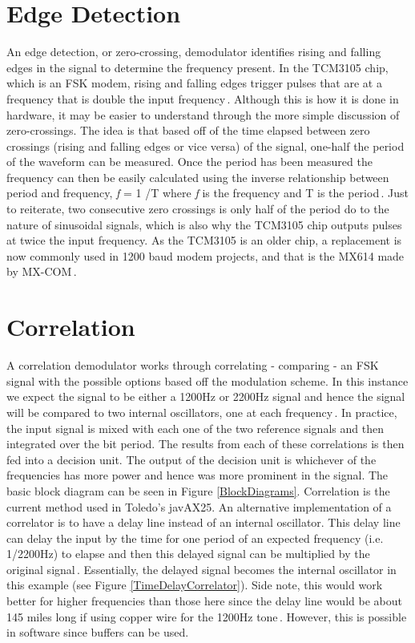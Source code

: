 \section{Edge Detection}
An edge detection, or zero-crossing, demodulator identifies rising and falling edges in the signal to determine the frequency present. In the TCM3105 chip, which is an FSK modem, rising and falling edges trigger pulses that are at a frequency that is double the input frequency\,\cite{Instruments1994}. Although this is how it is done in hardware, it may be easier to understand through the more simple discussion of zero-crossings. The idea is that based off of the time elapsed between zero crossings (rising and falling edges or vice versa) of the signal, one-half the period of the waveform can be measured. Once the period has been measured the frequency can then be easily calculated using the inverse relationship between period and frequency, \textit{f} = 1 /T where \textit{f} is the frequency and T is the period\,\cite{Seguine2006}. Just to reiterate, two consecutive zero crossings is only half of the period do to the nature of sinusoidal signals, which is also why the TCM3105 chip outputs pulses at twice the input frequency. As the TCM3105 is an older chip, a replacement is now commonly used in 1200 baud modem projects, and that is the MX614 made by MX-COM\,\cite{Mitrenga2000}.

\section{Correlation}
A correlation demodulator works through correlating - comparing - an FSK signal with the possible options based off the modulation scheme. In this instance we expect the signal to be either a 1200Hz or 2200Hz signal and hence the signal will be compared to two internal oscillators, one at each frequency\,\cite{Rowe2014}. In practice, the input signal is mixed with each one of the two reference signals and then integrated over the bit period. The results from each of these correlations is then fed into a decision unit. The output of the decision unit is whichever of the frequencies has more power and hence was more prominent in the signal. The basic block diagram can be seen in Figure \ref{BlockDiagrams}. Correlation is the current method used in Toledo's javAX25. An alternative implementation of a correlator is to have a delay line instead of an internal oscillator. This delay line can delay the input by the time for one period of an expected frequency (i.e. 1/2200Hz) to elapse and then this delayed signal can be multiplied by the original signal\,\cite{Seguine2006}. Essentially, the delayed signal becomes the internal oscillator in this example (see Figure \ref{TimeDelayCorrelator}). Side note, this would work better for higher frequencies than those here since the delay line would be about 145 miles long if using copper wire for the 1200Hz tone\,\cite{HowFastIsElectricity}. However, this is possible in software since buffers can be used.

